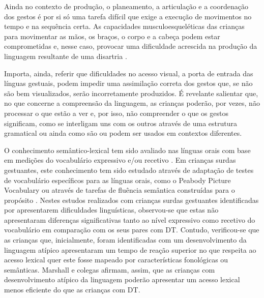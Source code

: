 \documentclass[output=paper,colorlinks,citecolor=brown,booklanguage=portuguese]{langscibook}
\begin{document}
Ainda no contexto de produção, o planeamento, a articulação e a coordenação dos gestos é por si só uma tarefa difícil que exige a execução de movimentos no tempo e na sequência certa. As capacidades musculoesqueléticas das crianças para movimentar as mãos, os braços, o corpo e a cabeça podem estar comprometidas e, nesse caso, provocar uma dificuldade acrescida na produção da linguagem resultante de uma disartria \citep{Tyrone2014}. 

Importa, ainda, referir que dificuldades no acesso visual, a porta de entrada das línguas gestuais, podem impedir uma assimilação correta dos gestos que, se não são bem visualizados, serão incorretamente produzidos. É revelante salientar que, no que concerne a compreensão da linguagem, as crianças poderão, por vezes, não processar o que estão a ver e, por isso, não compreender o que os gestos significam, como se interligam uns com os outros através de uma estrutura gramatical ou ainda como são ou podem ser usados em contextos diferentes.

O conhecimento semântico-lexical tem sido avaliado nas línguas orais com base em medições do vocabulário expressivo e/ou recetivo \citep{SuaKay2011}. Em crianças surdas gestuantes, este conhecimento tem sido estudado através de adaptação de testes de vocabulário específicos para as línguas orais, como o Peabody Picture Vocabulary \citep{Dunn1981, Morgan2007} ou através de tarefas de fluência semântica construídas para o propósito \citep{Marshall2013}. Nestes estudos realizados com crianças surdas gestuantes identificadas por apresentarem dificuldades linguísticas, observou-se que estas não apresentaram diferenças significativas tanto ao nível expressivo como recetivo do vocabulário em comparação com os seus pares com DT. Contudo, verificou-se que as crianças que, inicialmente, foram identificadas com um desenvolvimento da linguagem atípico apresentaram um tempo de reação superior no que respeita ao acesso lexical quer este fosse mapeado por características fonológicas ou semânticas. Marshall e colegas \citep{Marshall2013} afirmam, assim, que as crianças com desenvolvimento atípico da linguagem poderão apresentar um acesso lexical menos eficiente do que as crianças com DT. 
\end{document}
